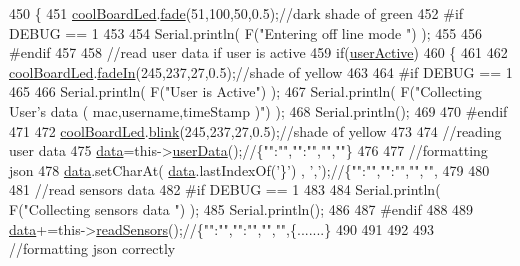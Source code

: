 \begin{DoxyCode}
450 \{
451     \hyperlink{classCoolBoard_a1b1d3c684a5baa56b08486e192fd8e97}{coolBoardLed}.\hyperlink{classCoolBoardLed_af1cacbaa88db8bcf6042c1083ba41155}{fade}(51,100,50,0.5);\textcolor{comment}{//dark shade of green  }
452 \textcolor{preprocessor}{#if DEBUG == 1  }
453     
454     Serial.println( F(\textcolor{stringliteral}{"Entering off line mode "}) ); 
455     
456 \textcolor{preprocessor}{#endif}
457 
458     \textcolor{comment}{//read user data if user is active}
459     \textcolor{keywordflow}{if}(\hyperlink{classCoolBoard_a6395459131d6889a3005f79c7a35e964}{userActive})
460     \{
461 
462         \hyperlink{classCoolBoard_a1b1d3c684a5baa56b08486e192fd8e97}{coolBoardLed}.\hyperlink{classCoolBoardLed_ab778f5e7bed0ab74e3906d82110493c3}{fadeIn}(245,237,27,0.5);\textcolor{comment}{//shade of yellow}
463 
464 \textcolor{preprocessor}{    #if DEBUG == 1}
465         
466         Serial.println( F(\textcolor{stringliteral}{"User is Active"}) );
467         Serial.println( F(\textcolor{stringliteral}{"Collecting User's data ( mac,username,timeStamp )"}) );
468         Serial.println();
469 
470 \textcolor{preprocessor}{    #endif}
471 
472         \hyperlink{classCoolBoard_a1b1d3c684a5baa56b08486e192fd8e97}{coolBoardLed}.\hyperlink{classCoolBoardLed_a96e1ea13003eee34c9dbcef340404426}{blink}(245,237,27,0.5);\textcolor{comment}{//shade of yellow   }
473 
474         \textcolor{comment}{//reading user data}
475         \hyperlink{classCoolBoard_a427fb753dd8575bdf821c70a5c63d695}{data}=this->\hyperlink{classCoolBoard_ae7358fb6e623cfc81b775f5f1734909b}{userData}();\textcolor{comment}{//\{"":"","":"","",""\}}
476 
477         \textcolor{comment}{//formatting json }
478         \hyperlink{classCoolBoard_a427fb753dd8575bdf821c70a5c63d695}{data}.setCharAt( \hyperlink{classCoolBoard_a427fb753dd8575bdf821c70a5c63d695}{data}.lastIndexOf(\textcolor{charliteral}{'\}'}) , \textcolor{charliteral}{','});\textcolor{comment}{//\{"":"","":"","","",}
479         
480                 
481         \textcolor{comment}{//read sensors data}
482 \textcolor{preprocessor}{    #if DEBUG == 1}
483 
484         Serial.println( F(\textcolor{stringliteral}{"Collecting sensors data "}) );
485         Serial.println();
486 
487 \textcolor{preprocessor}{    #endif}
488 
489         \hyperlink{classCoolBoard_a427fb753dd8575bdf821c70a5c63d695}{data}+=this->\hyperlink{classCoolBoard_ad03abdce2e65f520bbf2cff0f2d083cf}{readSensors}();\textcolor{comment}{//\{"":"","":"","","",\{.......\}}
490 
491         
492 
493         \textcolor{comment}{//formatting json correctly}

\end{DoxyCode}
